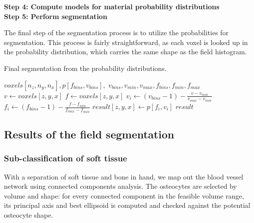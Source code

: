 \vspace{\baselineskip}
\noindent\textbf{Step 4: Compute models for material probability distributions} \\


\vspace{\baselineskip}
\noindent\textbf{Step 5: Perform segmentation}

The final step of the segmentation process is to utilize the probabilities for segmentation.
This process is fairly straightforward, as each voxel is looked up in the probability distribution, which carries the same shape as the field histogram.

\begin{algorithm}
    \caption{Final segmentation from the probability distributions.}
    \label{alg:segment}
    \begin{algorithmic}
         {$voxels[n_z,n_y,n_x], p[f_{bins},v_{bins}],$ \newline \indent \indent $v_{bins}, v_{min}, v_{max}, f_{bins}, f_{min}, f_{max}$}
                \State $v \gets voxels[z,y,x]$
                    \State $f \gets voxels[z,y,x]$
                        \State $v_i \gets (v_{bins} - 1) - \frac{v - v_{min}}{v_{max} - v_{min}}$
                        \State $f_i \gets (f_{bins} - 1) - \frac{f - f_{min}}{f_{max} - f_{min}}$
                        \State $result[z,y,x] \gets p[f_i, v_i]$
                    \EndIf
                \EndIf
            \EndFor
            \Return $result$
        \EndFunction
    \end{algorithmic}
\end{algorithm}

\subsection{Results of the field segmentation}

\subsubsection{Sub-classification of soft tissue}

With a separation of soft tissue and bone in hand, we 
map out the blood vessel network using connected components analysis. 
The osteocytes are selected by volume and shape: for every connected
component in the feasible volume range, its principal axis and best
ellipsoid is computed and checked against the potential osteocyte shape.

